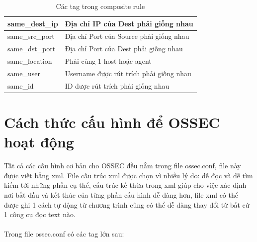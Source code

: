 \begin{itemize}
\begin{table}[h]
\begin{tabular}{|p{3cm}|p{10cm}|}
		 \hline
		 same\_dest\_ip & Địa chỉ IP của Dest phải giống nhau\\
		 \hline
		 same\_src\_port & Địa chỉ Port của Source phải giống nhau\\
		 \hline
		 same\_dst\_port & Địa chỉ Port của Dest phải giống nhau\\
		 \hline
		 same\_location & Phải cùng 1 host hoặc agent\\
		 \hline
		 same\_user & Username được rút trích phải giống nhau\\
		 \hline
		 same\_id & ID được rút trích phải giống nhau\\
		 \hline
		\end{tabular}
		\caption{Các tag trong composite rule}
	  \end{table}
  \end{itemize}\vfill
\section{Cách thức cấu hình để OSSEC hoạt động}
Tất cả các cấu hình cơ bản cho OSSEC đều nằm trong file ossec.conf, file này
được viết bằng xml. File cấu trúc xml được chọn vì nhiều lý do: dễ đọc và dễ tìm
kiếm tới những phần cụ thể, cấu trúc kế thừa trong xml giúp cho việc xác định
nơi bắt đầu và kết thúc của từng phần cấu hình dễ dàng hơn, file xml có thể được
ghi 1 cách tự động từ chương trình cũng có thể dễ dàng thay đổi từ bất cứ 1 công
cụ đọc text nào.\\\\ 
Trong file ossec.conf có các tag lớn sau:
